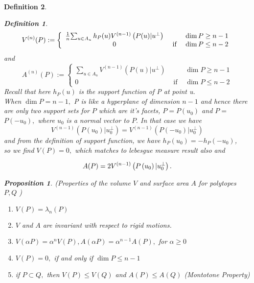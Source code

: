 \documentclass[oneside]{book}
\newtheorem{mydef}{Definition}
\newtheorem{prop}{Proposition}
\begin{document}
\begin{mydef}
\begin{mydef}
\begin{equation}
\label{eq43}
V^{(n)}(P):=\left\{\begin{array}{ccc}
\frac{1}{n} $$ \sum_{u \in A_{u}} h_{P}(u) V^{(n-1)}\left(P(u) | u^{\perp}\right) & & \operatorname{dim} P \geq n-1 \\
0 & \text { if } & \operatorname{dim} P \leq n-2
\end{array}\right.
\end{equation}
and
\begin{equation}
\label{eq44}
A^{(n)}(P):=\left\{\begin{array}{ccc}
\sum_{u \in A_{u}} V^{(n-1)}\left(P(u) | u^{\perp}\right) & & \operatorname{dim} P \geq n-1 \\
0 & \text { if } & \operatorname{dim} P \leq n-2
\end{array}\right.
\end{equation}
Recall that here $h_{P}(u)$ is the support function of P at point u. \\
 When $\operatorname{dim} P=n-1, $ P is like a hyperplane of dimension $n - 1$  and hence there are only two support sets for $P$ which are it's facets, $P=P\left(u_{0}\right)$ and $P=$ $P\left(-u_{0}\right),$ where $u_{0}$ is a normal vector to $P .$ In that case we have $$V^{(n-1)}\left(P\left(u_{0}\right) | u_{0}^{\perp}\right)=V^{(n-1)}\left(P\left(-u_{0}\right) | u_{0}^{\perp}\right)$$
 \newpage
and from the  definition of support function, we have $h_{P}\left(u_{0}\right)=-h_{P}\left(-u_{0}\right)$,\\ so we find $V(P)=0,$ which matches to lebesgue measure result also  and 
 
 \begin{equation}
 \label{eq45}
 A(P)=2 V^{(n-1)}\left(P\left(u_{0}\right) | u_{0}^{\perp}\right).\\\\
\end{equation}
\end{mydef} 
\begin{prop} \label{prop:1}
(Properties of the volume $V$ and surface area $A$ for polytopes $P, Q$ )
 \begin{enumerate}
 \item  $V(P)=\lambda_{n}(P)$
 \item  $V$ and $A$ are invariant with respect to rigid motions.
 \item $V(\alpha P)=\alpha^{n} V(P), A(\alpha P)=\alpha^{n-1} A(P),$ for $\alpha \geq 0$
 \item $V(P)=0,$ if and only if $\operatorname{dim} P \leq n-1$
 \item  if $P \subset Q,$ then $V(P) \leq V(Q)$ and $A(P) \leq A(Q)$    (Montotone Property)   \label{prop:5}
 \end{enumerate}
  \end{prop}
 

\end{mydef}
\end{document}
